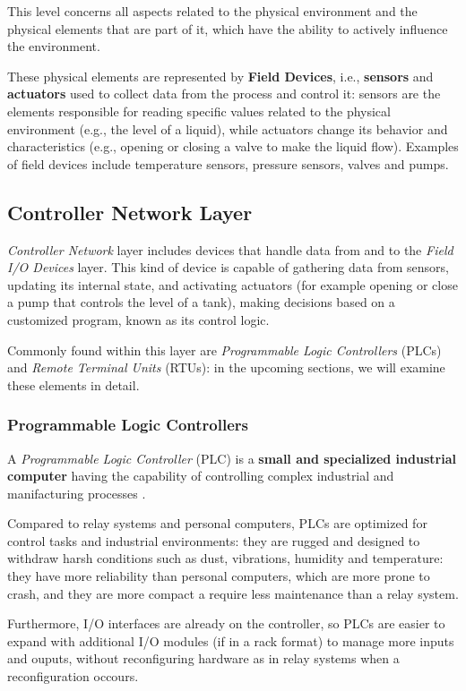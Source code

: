 This level concerns all aspects related to the physical environment and the physical elements that are part of it, which have the ability to actively influence the environment.
 
These physical elements are represented by \textbf{Field Devices}, i.e., \textbf{sensors} and \textbf{actuators} used to collect data from the process and control it: sensors are the elements responsible for reading specific values related to the physical environment (e.g., the level of a liquid), while actuators change its behavior and characteristics (e.g., opening or closing a valve to make the liquid flow). Examples of field devices include temperature sensors, pressure sensors, valves and pumps.

\subsection{Controller Network Layer}
\label{subsec:2_ot_controller_network}
\textit{Controller Network} layer includes devices that handle data from and
to the \textit{Field I/O Devices} layer. This kind of device is capable of gathering data from sensors, updating its internal state, and activating actuators (for example opening or close a pump that controls the level of a tank), making decisions based on a customized program, known as its control logic.

Commonly found within this layer are \textit{Programmable Logic Controllers} (PLCs) and \textit{Remote Terminal Units} (RTUs): in the upcoming sections, we will examine these elements in detail.

\subsubsection{Programmable Logic Controllers}
\label{subsubsec:2_plc}
A \textit{Programmable Logic Controller} (PLC) is a \textbf{small and specialized industrial computer} having the capability of controlling complex industrial and manifacturing processes \cite{plc_definition}.

\bigskip
Compared to relay systems and personal computers, PLCs are optimized for control tasks and industrial environments: they are rugged and designed to withdraw harsh conditions such as dust, vibrations, humidity and temperature: they have more reliability than personal computers, which are more prone to crash, and they are more compact a require less maintenance than a relay system.

Furthermore, I/O interfaces are already on the controller, so PLCs are easier to expand with additional I/O modules (if in a rack format) to manage more inputs and ouputs, without reconfiguring hardware as in relay systems when a reconfiguration occours. 

